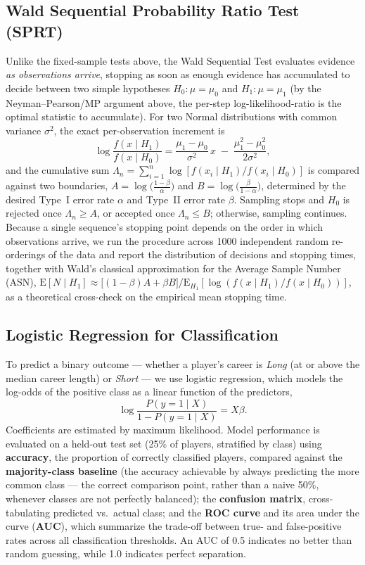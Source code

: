 \documentclass[10pt,twocolumn]{article}
\begin{document}
\subsection{Wald Sequential Probability Ratio Test (SPRT)}
Unlike the fixed-sample tests above, the Wald Sequential Test evaluates
evidence \textit{as observations arrive}, stopping as soon as enough
evidence has accumulated to decide between two simple hypotheses
$H_0: \mu = \mu_0$ and $H_1: \mu = \mu_1$ (by the Neyman--Pearson/MP
argument above, the per-step log-likelihood-ratio is the optimal
statistic to accumulate). For two Normal distributions with common
variance $\sigma^2$, the exact per-observation increment is
\[
  \log\frac{f(x\mid H_1)}{f(x\mid H_0)}
  = \frac{\mu_1-\mu_0}{\sigma^2}\,x \;-\; \frac{\mu_1^2-\mu_0^2}{2\sigma^2},
\]
and the cumulative sum $\Lambda_n=\sum_{i=1}^n \log[f(x_i\mid H_1)/f(x_i\mid H_0)]$
is compared against two boundaries, $A = \log\!\big(\tfrac{1-\beta}{\alpha}\big)$
and $B = \log\!\big(\tfrac{\beta}{1-\alpha}\big)$, determined by the
desired Type~I error rate $\alpha$ and Type~II error rate $\beta$.
Sampling stops and $H_0$ is rejected once $\Lambda_n \geq A$, or accepted
once $\Lambda_n \leq B$; otherwise, sampling continues. Because a
single sequence's stopping point depends on the order in which
observations arrive, we run the procedure across 1000 independent
random re-orderings of the data and report the distribution of
decisions and stopping times, together with Wald's classical
approximation for the Average Sample Number (ASN),
$\mathrm{E}[N\mid H_1] \approx \big[(1-\beta)A + \beta B\big] /
\mathrm{E}_{H_1}[\log(f(x\mid H_1)/f(x\mid H_0))]$, as a theoretical
cross-check on the empirical mean stopping time.

\subsection{Logistic Regression for Classification}
To predict a binary outcome --- whether a player's career is
\textit{Long} (at or above the median career length) or \textit{Short}
--- we use logistic regression, which models the log-odds of the
positive class as a linear function of the predictors,
\[
  \log \frac{P(y=1 \mid X)}{1 - P(y=1 \mid X)} = X\beta.
\]
Coefficients are estimated by maximum likelihood. Model performance is
evaluated on a held-out test set (25\% of players, stratified by class)
using \textbf{accuracy}, the proportion of correctly classified
players, compared against the \textbf{majority-class baseline} (the
accuracy achievable by always predicting the more common class ---
the correct comparison point, rather than a naive 50\%, whenever
classes are not perfectly balanced); the \textbf{confusion matrix},
cross-tabulating predicted vs.\ actual class; and the \textbf{ROC
curve} and its area under the curve (\textbf{AUC}), which summarize
the trade-off between true- and false-positive rates across all
classification thresholds. An AUC of 0.5 indicates no better than
random guessing, while 1.0 indicates perfect separation.
\end{document}

